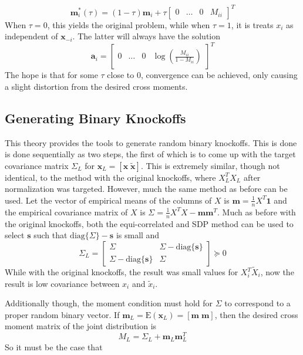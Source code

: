 \documentclass[11pt]{article}
\newcommand{\E}{\mathrm{E}}
\newcommand{\diag}[1]{\mathrm{diag}\{#1\}}
\theoremstyle{definition}
\begin{document}
    \[\mathbf m_i^*(\tau) = (1-\tau)\mathbf m_i + \tau \left[ \begin{array}{cccc} 0 & \ldots & 0 & M_{ii} \end{array} \right]^T \]
            When $\tau=0$, this yields the original problem, while when $\tau=1$, it is treats $x_i$ as independent of $\mathbf x_{-i}$. The latter will always have the solution
            \[\mathbf a_i = \left[ \begin{array}{cccc} 0 & \ldots & 0 & \log\left(\frac{M_{ii}}{1-M_{ii}}\right) \end{array} \right]^T \]
            The hope is that for some $\tau$ close to $0$, convergence can be achieved, only causing a slight distortion from the desired cross moments.

\subsection{Generating Binary Knockoffs}
This theory provides the tools to generate random binary knockoffs. This is done is done sequentially as two steps, the first of which is to come up with the target covariance matrix $\Sigma_L$ for $\mathbf x_L = [\mathbf x\; \mathbf{\tilde x}]$. This is extremely similar, though not identical, to the method with the original knockoffs, where $X_L^TX_L$ after normalization was targeted. However, much the same method as before can be used. Let the vector of empirical means of the columns of $X$ is $\mathbf m = \frac{1}{n}X^T\mathbf 1$ and the empirical covariance matrix of $X$ is $\Sigma = \frac{1}{n}X^TX - \mathbf{m}\mathbf{m}^T$. Much as before with the original knockoffs, both the equi-correlated and SDP method can be used to select  $\mathbf s$  such that $\diag{\Sigma}-\mathbf s$ is small and 
        \[ \Sigma_L = \left[\begin{array}{cc}  \Sigma & \Sigma - \diag{\mathbf s }\\ \Sigma - \diag{\mathbf s} & \Sigma \end{array}\right] \succeq 0 \]
    While with the original knockoffs, the result was small values for $X_i^T\tilde X_i$, now the result is low covariance between $x_i$ and $\tilde x_i$.\par
        Additionally though, the moment condition must hold for $\Sigma$ to correspond to a proper random binary vector. If $\mathbf m_L = \E\left(\mathbf x_L\right) = [\mathbf m \; \mathbf m]$, then the desired cross moment matrix of the joint distribution is 
        \[ M_L = \Sigma_L + \mathbf m_L\mathbf m_L^T\]
        So it must be the case that  
\end{document}
